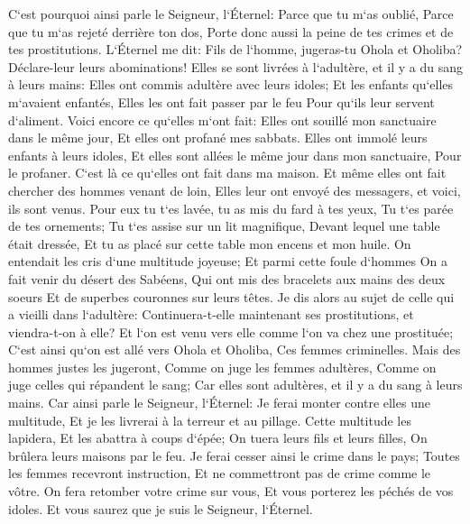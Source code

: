 \verse C`est pourquoi ainsi parle le Seigneur, l`Éternel: Parce que tu m`as oublié, Parce que tu m`as rejeté derrière ton dos, Porte donc aussi la peine de tes crimes et de tes prostitutions. 
\verse L`Éternel me dit: Fils de l`homme, jugeras-tu Ohola et Oholiba? Déclare-leur leurs abominations! 
\verse Elles se sont livrées à l`adultère, et il y a du sang à leurs mains: Elles ont commis adultère avec leurs idoles; Et les enfants qu`elles m`avaient enfantés, Elles les ont fait passer par le feu Pour qu`ils leur servent d`aliment. 
\verse Voici encore ce qu`elles m`ont fait: Elles ont souillé mon sanctuaire dans le même jour, Et elles ont profané mes sabbats. 
\verse Elles ont immolé leurs enfants à leurs idoles, Et elles sont allées le même jour dans mon sanctuaire, Pour le profaner. C`est là ce qu`elles ont fait dans ma maison. 
\verse Et même elles ont fait chercher des hommes venant de loin, Elles leur ont envoyé des messagers, et voici, ils sont venus. Pour eux tu t`es lavée, tu as mis du fard à tes yeux, Tu t`es parée de tes ornements; 
\verse Tu t`es assise sur un lit magnifique, Devant lequel une table était dressée, Et tu as placé sur cette table mon encens et mon huile. 
\verse On entendait les cris d`une multitude joyeuse; Et parmi cette foule d`hommes On a fait venir du désert des Sabéens, Qui ont mis des bracelets aux mains des deux soeurs Et de superbes couronnes sur leurs têtes. 
\verse Je dis alors au sujet de celle qui a vieilli dans l`adultère: Continuera-t-elle maintenant ses prostitutions, et viendra-t-on à elle? 
\verse Et l`on est venu vers elle comme l`on va chez une prostituée; C`est ainsi qu`on est allé vers Ohola et Oholiba, Ces femmes criminelles. 
\verse Mais des hommes justes les jugeront, Comme on juge les femmes adultères, Comme on juge celles qui répandent le sang; Car elles sont adultères, et il y a du sang à leurs mains. 
\verse Car ainsi parle le Seigneur, l`Éternel: Je ferai monter contre elles une multitude, Et je les livrerai à la terreur et au pillage. 
\verse Cette multitude les lapidera, Et les abattra à coups d`épée; On tuera leurs fils et leurs filles, On brûlera leurs maisons par le feu. 
\verse Je ferai cesser ainsi le crime dans le pays; Toutes les femmes recevront instruction, Et ne commettront pas de crime comme le vôtre. 
\verse On fera retomber votre crime sur vous, Et vous porterez les péchés de vos idoles. Et vous saurez que je suis le Seigneur, l`Éternel. 

